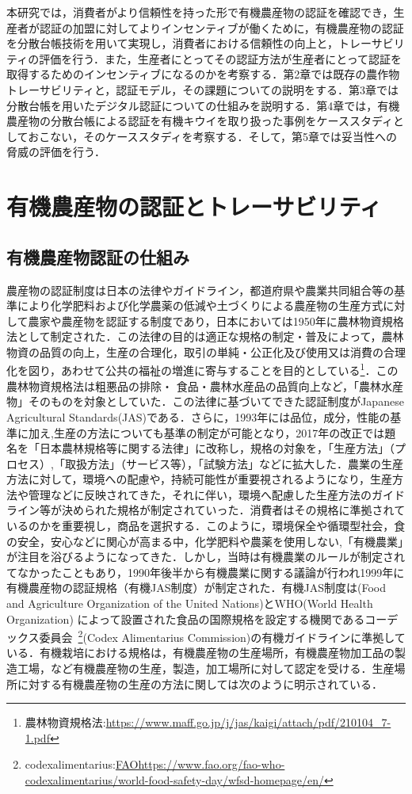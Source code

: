 \documentclass[11pt,dvipdfmx]{jreport}
\begin{document}
本研究では，消費者がより信頼性を持った形で有機農産物の認証を確認でき，生産者が認証の加盟に対してよりインセンティブが働くために，有機農産物の認証を分散台帳技術を用いて実現し，消費者における信頼性の向上と，トレーサビリティの評価を行う．また，生産者にとってその認証方法が生産者にとって認証を取得するためのインセンティブになるのかを考察する．第2章では既存の農作物トレーサビリティと，認証モデル，その課題についての説明をする．第3章では分散台帳を用いたデジタル認証についての仕組みを説明する．第4章では，有機農産物の分散台帳による認証を有機キウイを取り扱った事例をケーススタディとしておこない，そのケーススタディを考察する．そして，第5章では妥当性への脅威の評価を行う．


\chapter{有機農産物の認証とトレーサビリティ}
\section{有機農産物認証の仕組み}
農産物の認証制度は日本の法律やガイドライン，都道府県や農業共同組合等の基準により化学肥料および化学農薬の低減や土づくりによる農産物の生産方式に対して農家や農産物を認証する制度であり，日本においては1950年に農林物資規格法として制定された．この法律の目的は適正な規格の制定・普及によって，農林物資の品質の向上，生産の合理化，取引の単純・公正化及び使用又は消費の合理化を図り，あわせて公共の福祉の増進に寄与することを目的としている\footnote{農林物資規格法:\url{https://www.maff.go.jp/j/jas/kaigi/attach/pdf/210104_7-1.pdf}}．この農林物資規格法は粗悪品の排除・ 食品・農林水産品の品質向上など，「農林水産物」そのものを対象としていた．この法律に基づいてできた認証制度がJapanese Agricultural Standards(JAS)である．さらに，1993年には品位，成分，性能の基準に加え,生産の方法についても基準の制定が可能となり，2017年の改正では題名を「日本農林規格等に関する法律」に改称し，規格の対象を，「生産方法」（プロセス）,「取扱方法」（サービス等），「試験方法」などに拡大した．農業の生産方法に対して，環境への配慮や，持続可能性が重要視されるようになり，生産方法や管理などに反映されてきた，それに伴い，環境へ配慮した生産方法のガイドライン等が決められた規格が制定されていった．消費者はその規格に準拠されているのかを重要視し，商品を選択する．このように，環境保全や循環型社会，食の安全，安心などに関心が高まる中，化学肥料や農薬を使用しない,「有機農業」が注目を浴びるようになってきた．しかし，当時は有機農業のルールが制定されてなかったこともあり，1990年後半から有機農業に関する議論が行われ1999年に有機農産物の認証規格（有機JAS制度）が制定された．有機JAS制度は(Food and Agriculture Organization of the United Nations)とWHO(World Health Organization) によって設置された食品の国際規格を設定する機関であるコーデックス委員会~\footnote{codexalimentarius:\url{FAOhttps://www.fao.org/fao-who-codexalimentarius/world-food-safety-day/wfsd-homepage/en/}}(Codex Alimentarius Commission)の有機ガイドラインに準拠している．有機栽培における規格は，有機農産物の生産場所，有機農産物加工品の製造工場，など有機農産物の生産，製造，加工場所に対して認定を受ける．生産場所に対する有機農産物の生産の方法に関しては次のように明示されている．
\end{document}
